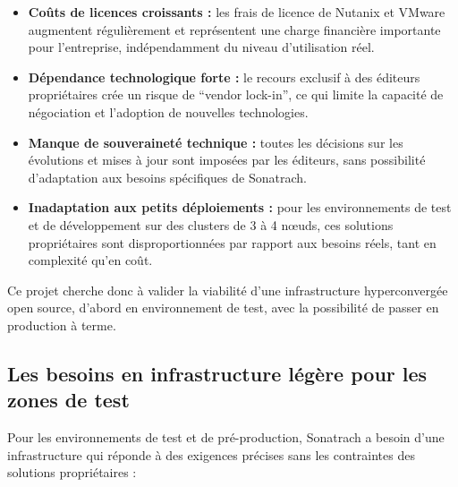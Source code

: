 \begin{itemize}

    \item \textbf{Coûts de licences croissants :} les frais de licence de Nutanix et VMware augmentent régulièrement et représentent une charge financière importante pour l'entreprise, indépendamment du niveau d'utilisation réel.

    \item \textbf{Dépendance technologique forte :} le recours exclusif à des éditeurs propriétaires crée un risque de ``vendor lock-in'', ce qui limite la capacité de négociation et l'adoption de nouvelles technologies.

    \item \textbf{Manque de souveraineté technique :} toutes les décisions sur les évolutions et mises à jour sont imposées par les éditeurs, sans possibilité d'adaptation aux besoins spécifiques de Sonatrach.

    \item \textbf{Inadaptation aux petits déploiements :} pour les environnements de test et de développement sur des clusters de 3 à 4 n\oe{}uds, ces solutions propriétaires sont disproportionnées par rapport aux besoins réels, tant en complexité qu'en coût.

\end{itemize}

\par Ce projet cherche donc à valider la viabilité d'une infrastructure hyperconvergée open source, d'abord en environnement de test, avec la possibilité de passer en production à terme.\\

\subsection{Les besoins en infrastructure légère pour les zones de test}

\par Pour les environnements de test et de pré-production, Sonatrach a besoin d'une infrastructure qui réponde à des exigences précises sans les contraintes des solutions propriétaires :\\

